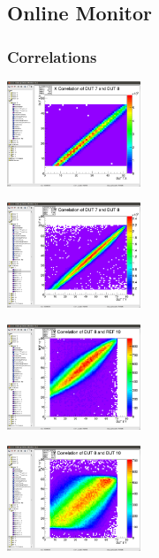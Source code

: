 \documentclass[9pt]{beamer}
\begin{document}
\subsection{Online Monitor}
\begin{frame}
	\frametitle{Correlations}
	\begin{center}
		\begin{minipage}{5.5cm}
			\centering
			\includegraphics[width=4.0cm]{Pics/correlation1x.png}
		\end{minipage}
		\hspace*{2pt}
		\begin{minipage}{5.5cm}
			\centering
			\includegraphics[width=4.0cm]{Pics/correlation1y.png}
		\end{minipage}\no\s
		\begin{minipage}{5.5cm}
			\centering
			\includegraphics[width=4.0cm]{Pics/correlation2y.png}
		\end{minipage}
		\hspace*{2pt}
		\begin{minipage}{5.5cm}
			\centering
			\includegraphics[width=4.0cm]{Pics/correlation3y.png}
		\end{minipage}\no\s
	\end{center}
\end{frame}
\end{document}
